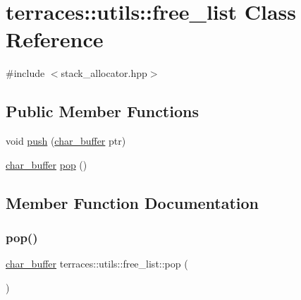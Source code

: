 \hypertarget{classterraces_1_1utils_1_1free__list}{}\section{terraces\+:\+:utils\+:\+:free\+\_\+list Class Reference}
\label{classterraces_1_1utils_1_1free__list}


{\ttfamily \#include $<$stack\+\_\+allocator.\+hpp$>$}

\subsection*{Public Member Functions}
\begin{DoxyCompactItemize}
\item 
void \hyperlink{classterraces_1_1utils_1_1free__list_a40130edfe36feff64e9ec3de5cc2f769}{push} (\hyperlink{namespaceterraces_1_1utils_a899529841c01a7e7152ac5ef8496c024}{char\+\_\+buffer} ptr)
\item 
\hyperlink{namespaceterraces_1_1utils_a899529841c01a7e7152ac5ef8496c024}{char\+\_\+buffer} \hyperlink{classterraces_1_1utils_1_1free__list_a1a03cbac7b032f831db07d4174f5519e}{pop} ()
\end{DoxyCompactItemize}


\subsection{Member Function Documentation}
\mbox{\label{classterraces_1_1utils_1_1free__list_a1a03cbac7b032f831db07d4174f5519e}} 
\subsubsection{\texorpdfstring{pop()}{pop()}}
{\footnotesize\ttfamily \hyperlink{namespaceterraces_1_1utils_a899529841c01a7e7152ac5ef8496c024}{char\+\_\+buffer} terraces\+::utils\+::free\+\_\+list\+::pop (\begin{DoxyParamCaption}{ }\end{DoxyParamCaption})\hspace{0.3cm}{\ttfamily [inline]}}

\mbox{\label{classterraces_1_1utils_1_1free__list_a40130edfe36feff64e9ec3de5cc2f769}} 
